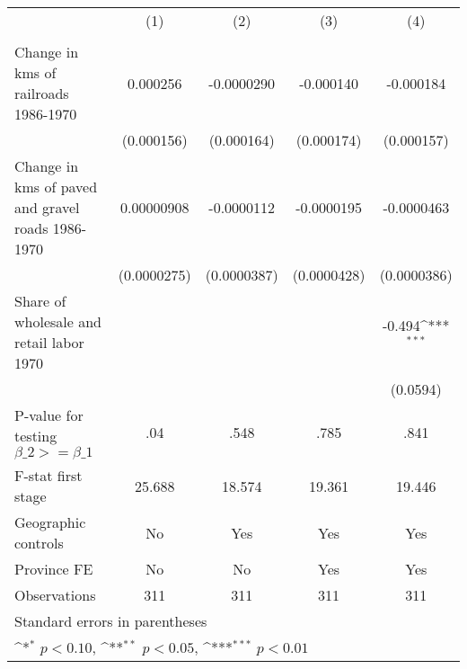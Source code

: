 {
\def\sym#1{\ifmmode^{#1}\else\(^{#1}\)\fi}
\begin{tabular}{l*{4}{c}}
\hline\hline
                &\multicolumn{1}{c}{(1)}&\multicolumn{1}{c}{(2)}&\multicolumn{1}{c}{(3)}&\multicolumn{1}{c}{(4)}\\
                &\multicolumn{1}{c}{}&\multicolumn{1}{c}{}&\multicolumn{1}{c}{}&\multicolumn{1}{c}{}\\
\hline
Change in kms of railroads 1986-1970& 0.000256         &-0.0000290         &-0.000140         &-0.000184         \\
                &(0.000156)         &(0.000164)         &(0.000174)         &(0.000157)         \\
[1em]
Change in kms of paved and gravel roads 1986-1970&0.00000908         &-0.0000112         &-0.0000195         &-0.0000463         \\
                &(0.0000275)         &(0.0000387)         &(0.0000428)         &(0.0000386)         \\
[1em]
Share of wholesale and retail labor 1970&                  &                  &                  &   -0.494\sym{***}\\
                &                  &                  &                  & (0.0594)         \\
\hline
P-value for testing $\beta\_{2} >= \beta\_{1}$&      .04         &     .548         &     .785         &     .841         \\
F-stat first stage&   25.688         &   18.574         &   19.361         &   19.446         \\
Geographic controls&       No         &      Yes         &      Yes         &      Yes         \\
Province FE     &       No         &       No         &      Yes         &      Yes         \\
Observations    &      311         &      311         &      311         &      311         \\
\hline\hline
\multicolumn{5}{l}{\footnotesize Standard errors in parentheses}\\
\multicolumn{5}{l}{\footnotesize \sym{*} \(p<0.10\), \sym{**} \(p<0.05\), \sym{***} \(p<0.01\)}\\
\end{tabular}
}
